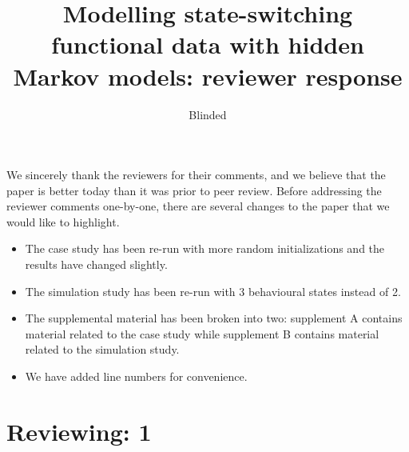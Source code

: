 \documentclass{article}
\begin{document}
\title{Modelling state-switching functional data with hidden Markov models: reviewer response}
\date{}
\author{Blinded}

\maketitle

We sincerely thank the reviewers for their comments, and we believe that the paper is better today than it was prior to peer review. Before addressing the reviewer comments one-by-one, there are several changes to the paper that we would like to highlight.

\begin{itemize}
    \item The case study has been re-run with more random initializations and the results have changed slightly.
    \item The simulation study has been re-run with 3 behavioural states instead of 2.
    \item The supplemental material has been broken into two: supplement A contains material related to the case study while supplement B contains material related to the simulation study. 
    \item We have added line numbers for convenience.
\end{itemize}


\section{Reviewing: 1}
\end{document}
